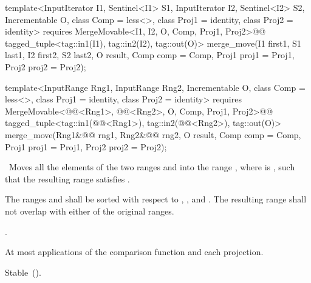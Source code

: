 \begin{addedblock}
%
\begin{itemdecl}
template<InputIterator I1, Sentinel<I1> S1, InputIterator I2, Sentinel<I2> S2,
    Incrementable O, class Comp = less<>, class Proj1 = identity,
    class Proj2 = identity>
  requires MergeMovable<I1, I2, O, Comp, Proj1, Proj2>@\newtxt{()}@
  tagged_tuple<tag::in1(I1), tag::in2(I2), tag::out(O)>
    merge_move(I1 first1, S1 last1, I2 first2, S2 last2, O result,
               Comp comp = Comp{}, Proj1 proj1 = Proj1{}, Proj2 proj2 = Proj2{});

template<InputRange Rng1, InputRange Rng2, Incrementable O, class Comp = less<>,
    class Proj1 = identity, class Proj2 = identity>
  requires MergeMovable<@@<Rng1>, @@<Rng2>, O, Comp, Proj1, Proj2>@\newtxt{()}@
  tagged_tuple<tag::in1(@@<Rng1>),
               tag::in2(@@<Rng2>),
               tag::out(O)>
    merge_move(Rng1&@\newtxt{\&}@ rng1, Rng2&@\newtxt{\&}@ rng2, O result,
               Comp comp = Comp{}, Proj1 proj1 = Proj1{}, Proj2 proj2 = Proj2{});
\end{itemdecl}

\begin{itemdescr}
\pnum
\effects\ Moves all the elements of the two ranges  and
 into the range , where 
is , such that the resulting range satisfies
.

\pnum
\requires The ranges  and  shall be
sorted with respect to , , and .
The resulting range shall not overlap with either of the original ranges.

\pnum
\returns
{}.

\pnum
\complexity
At most
applications of the comparison function and each projection.

\pnum
\remarks Stable~().
\end{itemdescr}
\end{addedblock}


